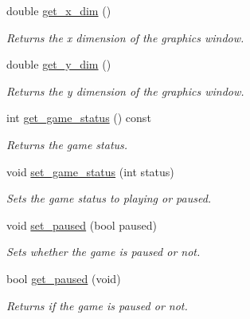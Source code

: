 \begin{DoxyCompactItemize}
double \mbox{\hyperlink{class_arena_a5e3be20f2c67338a5a684b85a66f6b96}{get\+\_\+x\+\_\+dim}} ()
\begin{DoxyCompactList}\small\item\em Returns the x dimension of the graphics window. \end{DoxyCompactList}\item 
\mbox{\label{class_arena_a35737d65ff32f2bd5871f0bdfbc10a85}} 
double \mbox{\hyperlink{class_arena_a35737d65ff32f2bd5871f0bdfbc10a85}{get\+\_\+y\+\_\+dim}} ()
\begin{DoxyCompactList}\small\item\em Returns the y dimension of the graphics window. \end{DoxyCompactList}\item 
\mbox{\label{class_arena_a4d599cccea003b9c60ddb39535c058f4}} 
int \mbox{\hyperlink{class_arena_a4d599cccea003b9c60ddb39535c058f4}{get\+\_\+game\+\_\+status}} () const
\begin{DoxyCompactList}\small\item\em Returns the game status. \end{DoxyCompactList}\item 
\mbox{\label{class_arena_ac8e8b3438db02aa5395f7fcb537ed952}} 
void \mbox{\hyperlink{class_arena_ac8e8b3438db02aa5395f7fcb537ed952}{set\+\_\+game\+\_\+status}} (int status)
\begin{DoxyCompactList}\small\item\em Sets the game status to playing or paused. \end{DoxyCompactList}\item 
\mbox{\label{class_arena_a92e4a5857a642909af5e76e8b8129f03}} 
void \mbox{\hyperlink{class_arena_a92e4a5857a642909af5e76e8b8129f03}{set\+\_\+paused}} (bool paused)
\begin{DoxyCompactList}\small\item\em Sets whether the game is paused or not. \end{DoxyCompactList}\item 
\mbox{\label{class_arena_a3b39ca9d3b5974b93d49317e43485962}} 
bool \mbox{\hyperlink{class_arena_a3b39ca9d3b5974b93d49317e43485962}{get\+\_\+paused}} (void)
\begin{DoxyCompactList}\small\item\em Returns if the game is paused or not. \end{DoxyCompactList}\item 

\end{DoxyCompactItemize}
